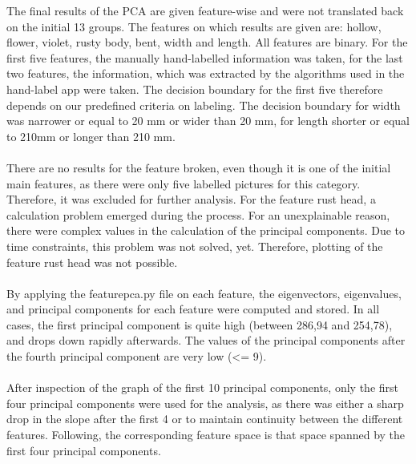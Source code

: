 
The final results of the PCA are given feature-wise and were not translated back on the initial 13 groups. The features on which results are given are: hollow, flower, violet, rusty body, bent, width and length. All features are binary. For the first five features, the manually hand-labelled information was taken, for the last two features, the information, which was extracted by the algorithms used in the hand-label app were taken. The decision boundary for the first five therefore depends on our predefined criteria on labeling. The decision boundary for width was narrower or equal to 20 mm or wider than 20 mm, for length shorter or equal to 210mm or longer than 210 mm.  \\
\\
There are no results for the feature broken, even though it is one of the initial main features, as there were only five labelled pictures for this category. Therefore, it was excluded for further analysis. For the feature rust head, a calculation problem emerged during the process. For an unexplainable reason, there were complex values in the calculation of the principal components. Due to time constraints, this problem was not solved, yet. Therefore, plotting of the feature rust head was not possible.  \\
\\
By applying the feature\textunderscore pca.py file on each feature, the eigenvectors, eigenvalues, and principal components for each feature were computed and stored. In all cases, the first principal component is quite high (between 286,94 and 254,78), and drops down rapidly afterwards. The values of the principal components after the fourth principal component are very low (<= 9).  \\
\\
After inspection of the graph of the first 10 principal components,  only the  first four principal components were used for the analysis, as there was either a sharp drop in the slope after the first 4 or to maintain continuity between the different features. Following, the corresponding feature space is that space spanned by the first four principal components.  \\
